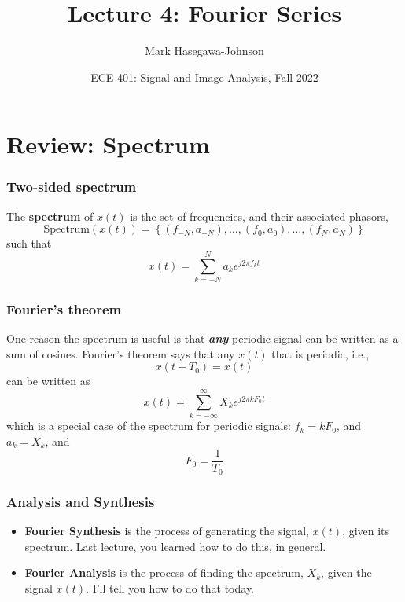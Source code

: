 \documentclass{beamer}
\title{Lecture 4: Fourier Series}
\author{Mark Hasegawa-Johnson}
\date{ECE 401: Signal and Image Analysis, Fall 2022}
\begin{document}
\begin{frame}
  \maketitle
\end{frame}

\begin{frame}
  \tableofcontents
\end{frame}

\section[Review]{Review: Spectrum}
\setcounter{subsection}{1}

\begin{frame}
  \frametitle{Two-sided spectrum}

  The {\bf spectrum} of $x(t)$ is the set of frequencies, and their
  associated phasors,
  \[
  \mbox{Spectrum}\left( x(t) \right) =
  \left\{ (f_{-N},a_{-N}), \ldots, (f_0,a_0), \ldots, (f_N,a_N) \right\}
  \]
  such that
  \[
  x(t) = \sum_{k=-N}^N a_ke^{j2\pi f_kt}
  \]
\end{frame}

\begin{frame}
  \frametitle{Fourier's theorem}

  One reason the spectrum is useful is that {\bf\em any} periodic
  signal can be written as a sum of cosines.  Fourier's theorem says that
  any $x(t)$ that is periodic, i.e.,
  \[
  x(t+T_0) = x(t)
  \]
  can be written as
  \[
  x(t) = \sum_{k=-\infty}^\infty X_k e^{j2\pi k F_0 t}
  \]
  which is a special case of the spectrum for periodic signals:
  $f_k=kF_0$, and $a_k=X_k$, and
  \[
  F_0 = \frac{1}{T_0}
  \]
\end{frame}

\begin{frame}
  \frametitle{Analysis and Synthesis}

  \begin{itemize}
  \item {\bf Fourier Synthesis} is the process of generating the
    signal, $x(t)$, given its spectrum.  Last lecture, you learned
    how to do this, in general.
  \item {\bf Fourier Analysis} is the process of finding the spectrum,
    $X_k$, given the signal $x(t)$.  I'll tell you how to do that today.
  \end{itemize}
\end{frame}
\end{document}
